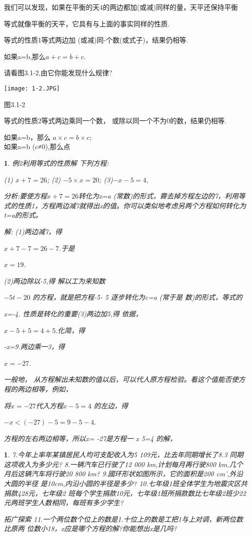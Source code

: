 \documentclass[11pt]{article}
\newtheorem{exercise}{ }
\newtheorem{example}{ }
\begin{document}
我们可以发现，如果在平衡的天4的两边都加(或减)同样的量，天平还保持平衡

等式就像平衡的天平，它具有与上面的事实同样的性质.

等式的性质1等式两边加 (或减)同-个数(或式子)，结果仍相等.

如果a=b,那么$a+c=b+c$.

请看图3.1-2,由它你能发现什么规律?
\begin{center}
  \texttt{[image: 1-2.JPG]}\\
\end{center}
图3.1-2

等式的性质2等式两边乘同一个数， 或除以同一个不为0的数，结果仍相等.

如果a=b，那么 $a \times c=b \times c$;\\

如果a=b (c≠0),那么点

\begin{example}

例2利用等式的性质解 下列方程:

(1) $x+7=26$;  (2) $-5 \times x=20$;  (3)$-x-5=4$,

分析:要使方程$x+7=26$转化为x=a (常数)的形式，霽去掉方程左边的7，利用等式的性质1，方程两边减7就得出x的值。你可以类似地考虑另两个方程如何转化为t=a的形式。

解: (1)两边减7，得

$x+7-7=26-7$.于是

$x=19$.

(2)两边除以-5,得  解以工为来知数

$-5t-20$  的方程，就是把方程-5- 5  逐步转化为c=a (常于是  数)的形式，等式的

x=-4.  性质是转化的重要(3)两边加5,得  依据，

$x-5+5=4+5$.化简，得

-x=9.两边乘一3，得

$x=-27$.

一般地， 从方程解出未知数的值以后，可以代人原方程检验。看这个值能否使方程的两边相等，例如，

将$x=-27$代入方程$x-5=4$ 的左边，得

$-x<(-27)-5=9-5-4$.

方程的左右两边相等，所以x= -27是方程一 x 5=4 的解，
\end{example}

\begin{exercise}
7.今年上率年某镇居民人均可支配收入为5 109元，比去年同期增长了8.3%
同期这项收入为多少元?
8.一辆汽车已行驶了12 000 km,计划每月再行驶800 km.几个
月后这辆汽车将行驶20 800 km?
9.國环形状如图所示，它的面积是200 cm',外沿大圆的半径
是10cm,内沿小圆的半径是多少?
10.七年级1班全体学生为地震灾区共捐款428元，七年级2
班每个学生捐款10元，七年级1班所捐款数比七年级2班少22元两班学生人数相同，每班有多少学生?

拓广探索
11.一个两位数个位上的数是1.十位上的数是工把1与上对调，新两位数比原两
位数小18，x应是哪个方程的解?你能想出x是几吗?
\end{exercise}
\end{document}
